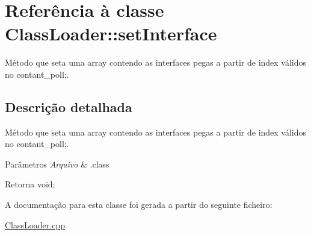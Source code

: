 \hypertarget{class_class_loader_1_1set_interface}{}\section{Referência à classe Class\+Loader\+:\+:set\+Interface}
\label{class_class_loader_1_1set_interface}


Método que seta uma array contendo as interfaces pegas a partir de index válidos no contant\+\_\+poll;.  




\subsection{Descrição detalhada}
Método que seta uma array contendo as interfaces pegas a partir de index válidos no contant\+\_\+poll;. 


\begin{DoxyParams}{Parâmetros}
{\em Arquivo} & .class \\
\hline
\end{DoxyParams}
\begin{DoxyReturn}{Retorna}
void; 
\end{DoxyReturn}


A documentação para esta classe foi gerada a partir do seguinte ficheiro\+:\begin{DoxyCompactItemize}
\item 
\hyperlink{_class_loader_8cpp}{Class\+Loader.\+cpp}\end{DoxyCompactItemize}
